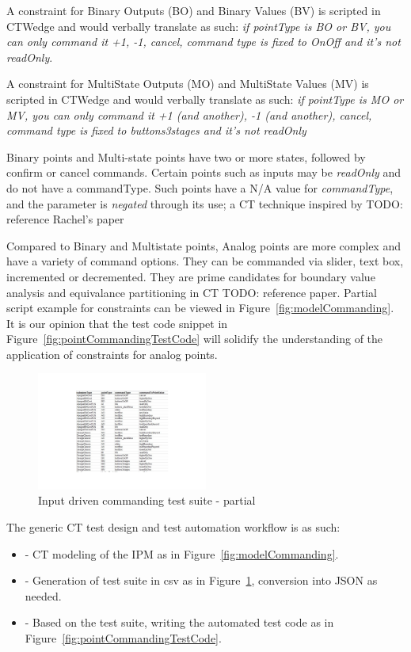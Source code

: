 \documentclass[conference]{IEEEtran}
\newcommand{\todo}[1]{}
\renewcommand{\todo}[1]{{\color{red} TODO: {#1}}}
\begin{document}
	A constraint for Binary Outputs (BO) and Binary Values (BV) is scripted in CTWedge and would verbally translate as such:
	\textit{if pointType is BO or BV, you can only command it +1, -1, cancel, command type is fixed to OnOff and it's not readOnly}.
	
	A constraint for MultiState Outputs (MO) and MultiState Values (MV) is scripted in CTWedge and would verbally translate as such:
	\textit{if pointType is MO or MV, you can only command it +1 (and another), -1 (and another), cancel, command type is fixed to buttons3stages and it's not readOnly}

	Binary points and Multi-state points have two or more states, followed by confirm or cancel commands. 
	Certain points such as inputs may be \textit{readOnly} and do not have a commandType. Such points have a N/A value for \textit{commandType}, and the parameter is \textit{negated} through its use; a CT technique inspired by \todo{reference Rachel's paper}	

	Compared to  Binary and Multistate points, Analog points are more complex and have a variety of command options.
	They can be commanded via slider, text box, incremented or decremented. 
	They are prime candidates for boundary value analysis and equivalance partitioning in CT \todo{reference paper}.
	Partial script example for constraints can be viewed in Figure~\ref{fig:modelCommanding}. 
	It is our opinion that the test code snippet in Figure~\ref{fig:pointCommandingTestCode} will solidify the understanding of the application of constraints for analog points.

	\begin{figure}[!h]
		\includegraphics[width=0.50\textwidth,]{csvOutputCommanding.pdf}
		\caption{Input driven commanding test suite - partial}
		\label{fig:csvOutputCommanding}
	\end{figure}

	The generic CT test design and test automation workflow is as such:
	\begin{itemize}
		\item [] - CT modeling of the IPM as in Figure~\ref{fig:modelCommanding}.
		\item [] - Generation of test suite in csv as in Figure~\ref{fig:csvOutputCommanding}, conversion into JSON as needed.
		\item [] - Based on the test suite, writing the automated test code as in Figure~\ref{fig:pointCommandingTestCode}.
	\end{itemize}
\end{document}
